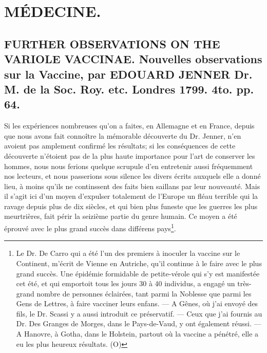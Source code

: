 \setcounter{page}{261}
\chapter{MÉDECINE.}
\section{FURTHER OBSERVATIONS ON THE VARIOLE VACCINAE. Nouvelles observations sur la Vaccine, par EDOUARD JENNER Dr. M. de la Soc. Roy. etc. Londres 1799. 4to. pp. 64.}
Si les expériences nombreuses qu'on a faites, en Allemagne et en France, depuis que nous avons fait connoître la mémorable découverte du Dr. Jenner, n'en avoient pas amplement confirmé les résultats; si les conséquences de cette découverte n'étoient pas de la plus haute importance pour l'art de conserver les hommes, nous nous ferions quelque scrupule d'en entretenir aussi fréquemment nos lecteurs, et nous passerions sous silence les divers écrits auxquels elle a donné lieu, à moins qu'ils ne continssent des faits bien saillans par leur nouveauté.
Mais il s'agit ici d'un moyen d'expulser totalement de l'Europe un fléau terrible qui la ravage depuis plus de dix siècles, et qui bien plus funeste que les guerres les plus meurtrières, fait périr la seizième partie du\setcounter{page}{262} genre humain. Ce moyen a été éprouvé avec le plus grand succès dans différens pays\footnote{Le Dr. De Carro qui a été l'un des premiers à inoculer la vaccine sur le Continent, m'écrit de Vienne en Autriche, qu'il continue à le faire avec le plus grand succès. Une épidémie formidable de petite-vérole qui s'y est manifestée cet été, et qui emportoit tous les jours 30 à 40 individus, a engagé un très-grand nombre de personnes éclairées, tant parmi la Noblesse que parmi les Gens de Lettres, à faire vacciner leurs enfans. --- A Gênes, où j'ai envoyé des fils, le Dr. Scassi y a aussi introduit ce préservatif. --- Ceux que j'ai fournis au Dr. Des Granges de Morges, dans le Pays-de-Vaud, y ont également réussi. --- A Hanovre, à Gotha, dans le Holstein, partout où la vaccine a pénétré, elle a eu les plus heureux résultats. (O)}.
